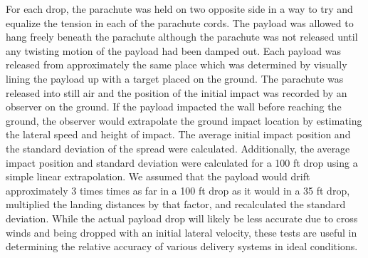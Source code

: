 \documentclass[]{auvsi_doc}
\begin{document}
For each drop, the parachute was held on two opposite side in a way to try and equalize the tension in each of the parachute cords. The payload was allowed to hang freely beneath the parachute although the parachute was not released until any twisting motion of the payload had been damped out. Each payload was released from approximately the same place which was determined by visually lining the payload up with a target placed on the ground. The parachute was released into still air and the position of the initial impact was recorded by an observer on the ground. If the payload impacted the wall before reaching the ground, the observer would extrapolate the ground impact location by estimating the lateral speed and height of impact. The average initial impact position and the standard deviation of the spread were calculated. Additionally, the average impact position and standard deviation were calculated for a 100 ft drop using a simple linear extrapolation. We assumed that the payload would drift approximately 3 times times as far in a 100 ft drop as it would in a 35 ft drop,  multiplied the landing distances by that factor, and recalculated the standard deviation. While the actual payload drop will likely be less accurate due to cross winds and being dropped with an initial lateral velocity, these tests are useful in determining the relative accuracy of various delivery systems in ideal conditions.
\end{document}
